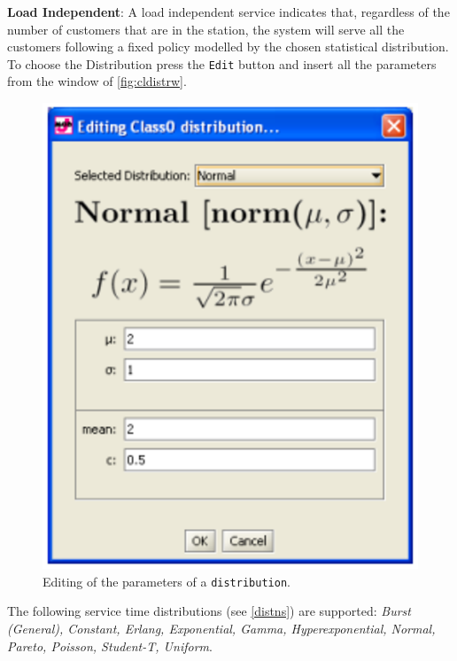 \begin{itemize*}
\item \textbf{Load Independent}: A load independent service
indicates that, regardless of the number of customers that are in
the station, the system will serve all the customers following a
fixed policy modelled by the chosen statistical distribution. To
choose the Distribution press the \texttt{Edit} button and insert
all the parameters from the window of \autoref{fig:cldistrw}.
\begin{figure}[htb]
    \begin{center}
        \includegraphics[scale=.5]{img/jsimg/8.17.eps}
    \end{center}
    \caption{Editing of the parameters of a \texttt{distribution}.}
    \label{fig:cldistrw}
\end{figure}

The following service time distributions (see \autoref{distns})
are supported: \emph{Burst (General), Constant, Erlang,
Exponential, Gamma, Hyperexponential, Normal, Pareto, Poisson,
Student-T, Uniform}.


\end{itemize*}

